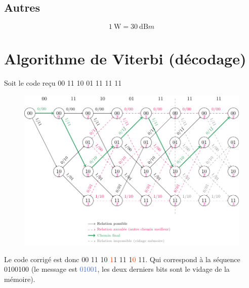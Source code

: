 \documentclass[resume]{subfiles}
\begin{document}
\begin{multicols}{3}
\section{Autres}
$$\SI{1}{\watt}=\SI{30}{\deci\bel m}$$
\end{multicols}
\section{Algorithme de Viterbi (décodage)}
Soit le code reçu 00 11 10 01 11 11 11
\begin{figure}[H]
\centering
\includegraphics[scale=0.6]{Viterbi.pdf}
\end{figure}
Le code corrigé est donc
00 11 10 \textcolor{OrangeRed}{1}1 11 1\textcolor{OrangeRed}{0} 11. Qui correspond à la séquence 0100100 (le message est \textcolor{RoyalBlue}{01001}, les deux derniers bits sont le vidage de la mémoire).
\end{document}
